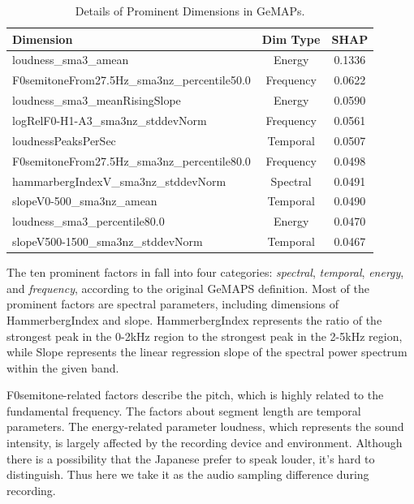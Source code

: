 \begin{table}[th]
	\small
	\centering
	\begin{tabular}{l|c|c}
		\toprule
		Dimension & Dim Type & SHAP  \\
		\midrule
		loudness\_sma3\_amean & Energy &  0.1336     \\
		F0semitoneFrom27.5Hz\_sma3nz\_percentile50.0 & Frequency &  0.0622  \\
		loudness\_sma3\_meanRisingSlope & Energy &  0.0590  \\
		logRelF0-H1-A3\_sma3nz\_stddevNorm  & Frequency & 0.0561  \\
		loudnessPeaksPerSec& Temporal  & 0.0507 \\
		F0semitoneFrom27.5Hz\_sma3nz\_percentile80.0 & Frequency  & 0.0498  \\
		hammarbergIndexV\_sma3nz\_stddevNorm & Spectral & 0.0491 \\
		slopeV0-500\_sma3nz\_amean & Temporal & 0.0490 \\
		loudness\_sma3\_percentile80.0& Energy & 0.0470  \\
		slopeV500-1500\_sma3nz\_stddevNorm& Temporal  & 0.0467\\
		\bottomrule
	\end{tabular}
	\caption{Details of Prominent Dimensions in GeMAPs. }
	\label{table:prominentfactor}
\end{table}
The ten prominent factors in  fall into four categories: 
\textit{spectral}, \textit{temporal}, \textit{energy}, and \textit{frequency}, 
according to the original GeMAPS definition. Most of the prominent factors are
spectral parameters, including dimensions of HammerbergIndex and slope. 
HammerbergIndex represents the ratio of the strongest peak in the 0-2kHz region to 
the strongest peak in the 2-5kHz region, while Slope represents the linear regression slope 
of the spectral power spectrum within the given band.

F0semitone-related factors describe the pitch, which is highly related to the
fundamental frequency. The factors about segment length are temporal parameters. 
The energy-related parameter loudness, which represents the sound intensity, 
is largely affected by the recording device and environment. 
Although there is a possibility that the Japanese prefer to speak louder, 
it's hard to distinguish. Thus here we take it as the audio sampling difference 
during recording. 

